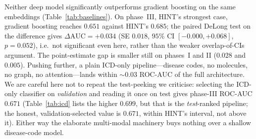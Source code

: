\documentclass[a4paper,fleqn]{cas-sc}
\begin{document}
Neither deep model significantly outperforms gradient boosting on the same embeddings
(Table~\ref{tab:baselines}). On phase~III, HINT's strongest case, gradient boosting reaches
$0.651$ against HINT's $0.685$; the paired DeLong test on the difference gives
$\Delta\text{AUC}=+0.034$ (SE $0.018$, $95\%$ CI $[-0.000,+0.068]$, $p=0.052$), i.e.\ not
significant even here, rather than the weaker overlap-of-CIs argument. The point-estimate gap
is smaller still on phases~I and II ($0.028$ and $0.005$). Pushing further, a plain ICD-only
pipeline---disease codes, no molecules, no graph, no attention---lands within $\sim0.03$
ROC-AUC of the full architecture. We are careful here not to repeat the test-peeking we criticise:
selecting the ICD-only classifier on \emph{validation} and reading it once on test gives phase-III
ROC-AUC $0.671$ (Table~\ref{tab:icd} lists the higher $0.699$, but that is the \emph{test}-ranked
pipeline; the honest, validation-selected value is $0.671$, within HINT's interval, not above it).
Either way the elaborate multi-modal machinery buys nothing over a shallow disease-code model.
\end{document}
